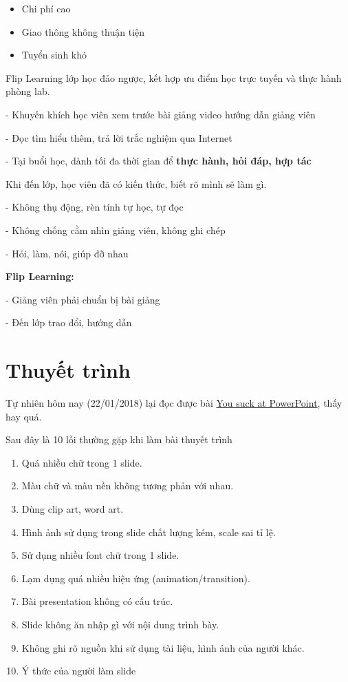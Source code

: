 \begin{itemize}
  \item Chi phí cao
  \item Giao thông không thuận tiện
  \item Tuyển sinh khó
\end{itemize}

Flip Learning lớp học đảo ngược, kết hợp ưu điểm học trực tuyến và thực hành phòng lab.

- Khuyến khích học viên xem trước bài giảng video hướng dẫn giảng viên

- Đọc tìm hiểu thêm, trả lời trắc nghiệm qua Internet

- Tại buổi học, dành tối đa thời gian để \textbf{thực hành, hỏi đáp, hợp tác}

Khi đến lớp, học viên đã có kiến thức, biết rõ mình sẽ làm gì.

- Không thụ động, rèn tính tự học, tự đọc

- Không chống cằm nhìn giảng viên, không ghi chép

- Hỏi, làm, nói, giúp đỡ nhau

\textbf{Flip Learning:}

- Giảng viên phải chuẩn bị bài giảng

- Đến lớp trao đổi, hướng dẫn

\section{Thuyết trình}

Tự nhiên hôm nay (22/01/2018) lại đọc được bài \href{https://huynq.net/you-suck-at-powerpoint/}{You suck at PowerPoint}, thấy hay quá.

Sau đây là 10 lỗi thường gặp khi làm bài thuyết trình

\begin{enumerate}
  \item Quá nhiều chữ trong 1 slide.
  \item Màu chữ và màu nền không tương phản với nhau.
  \item Dùng clip art, word art.
  \item Hình ảnh sử dụng trong slide chất lượng kém, scale sai tỉ lệ.
  \item Sử dụng nhiều font chữ trong 1 slide.
  \item Lạm dụng quá nhiều hiệu ứng (animation/transition).
  \item Bài presentation không có cấu trúc.
  \item Slide không ăn nhập gì với nội dung trình bày.
  \item Không ghi rõ nguồn khi sử dụng tài liệu, hình ảnh của người khác.
  \item Ý thức của người làm slide
\end{enumerate}

